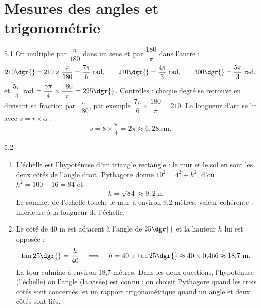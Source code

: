 \clearpage
\chapter{Mesures des angles et trigonométrie}

\begin{corrige}{5.1}
On multiplie par $\dfrac{\pi}{180}$ dans un sens et par $\dfrac{180}{\pi}$ dans l'autre :
\[
210\dgr{} = 210 \times \frac{\pi}{180} = \frac{7\pi}{6}\ \text{rad},
\qquad
240\dgr{} = \frac{4\pi}{3}\ \text{rad},
\qquad
300\dgr{} = \frac{5\pi}{3}\ \text{rad},
\]
et $\dfrac{5\pi}{4}$ rad $= \dfrac{5\pi}{4} \times \dfrac{180}{\pi} = 225\dgr{}$. Contrôles : chaque degré se retrouve en divisant sa fraction par $\dfrac{\pi}{180}$, par exemple $\dfrac{7\pi}{6} \times \dfrac{180}{\pi} = 210$. La longueur d'arc se lit avec $s = r \times \alpha$ :
\[
s = 8 \times \frac{\pi}{4} = 2\pi \approx 6{,}28\ \text{cm}.
\]
\end{corrige}

\begin{corrige}{5.2}
\begin{enumerate}
\item L'échelle est l'hypoténuse d'un triangle rectangle : le mur et le sol en sont les deux côtés de l'angle droit. Pythagore donne $10^{2} = 4^{2} + h^{2}$, d'où $h^{2} = 100 - 16 = 84$ et
\[
h = \sqrt{84} \approx 9{,}2\ \text{m}.
\]
Le sommet de l'échelle touche le mur à environ 9,2 mètres, valeur cohérente : inférieure à la longueur de l'échelle.
\item Le côté de $40$ m est adjacent à l'angle de $25\dgr{}$ et la hauteur $h$ lui est opposée :
\[
\tan 25\dgr{} = \frac{h}{40}
\quad\Longrightarrow\quad
h = 40 \times \tan 25\dgr{} \approx 40 \times 0{,}466 \approx 18{,}7\ \text{m}.
\]
La tour culmine à environ 18,7 mètres. Dans les deux questions, l'hypoténuse (l'échelle) ou l'angle (la visée) est connu : on choisit Pythagore quand les trois côtés sont concernés, et un rapport trigonométrique quand un angle et deux côtés sont liés.
\end{enumerate}
\end{corrige}


